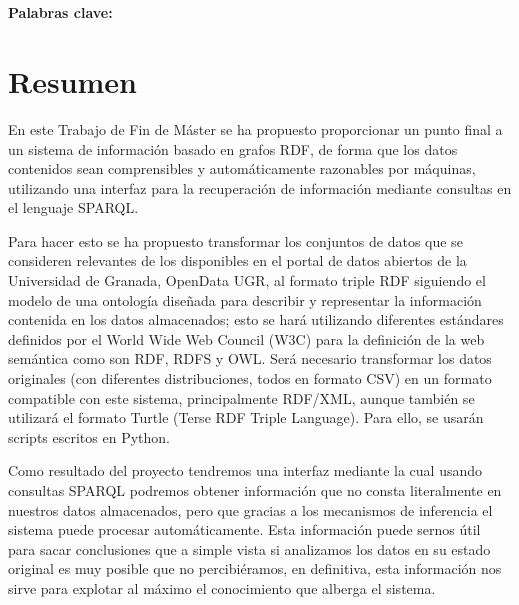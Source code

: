 \begin{center}
{\LARGE\bfseries\titulo}\\
\end{center}
\begin{center}
\autor\
\end{center}

\textbf{Palabras clave: }{\keywordsEs}

\section*{Resumen}

En este {\sf Trabajo de Fin de Máster} se ha propuesto proporcionar un punto final a un sistema de información basado en {\sf grafos RDF}, de forma que los datos contenidos sean comprensibles y automáticamente razonables por máquinas, utilizando una interfaz para la recuperación de información mediante consultas en el lenguaje {\sf SPARQL}. 

\bigskip
Para hacer esto se ha propuesto transformar los conjuntos de datos que se consideren relevantes de los disponibles en el portal de datos abiertos de la {\sf Universidad de Granada}, {\sf OpenData UGR}, al formato triple RDF siguiendo el modelo de una ontología diseñada para describir y representar la información contenida en los datos almacenados; esto se hará utilizando diferentes estándares definidos por el {\sf World Wide Web Council (W3C)} para la definición de la web semántica como son {\sf RDF}, {\sf RDFS} y {\sf OWL}. Será necesario transformar los datos originales (con diferentes distribuciones, todos en formato {\sf CSV}) en un formato compatible con este sistema, principalmente {\sf RDF/XML}, aunque también se utilizará el formato {\sf Turtle (Terse RDF Triple Language)}. Para ello, se usarán scripts escritos en {\sf Python}.

\bigskip
Como resultado del proyecto tendremos una interfaz mediante la cual usando consultas {\sf SPARQL} podremos obtener información que no consta literalmente en nuestros datos almacenados, pero que gracias a los mecanismos de inferencia el sistema puede procesar automáticamente. Esta información puede sernos útil para sacar conclusiones que a simple vista si analizamos los datos en su estado original es muy posible que no percibiéramos, en definitiva, esta información nos sirve para explotar al máximo el conocimiento que alberga el sistema.

\newpage
\begin{center}
{\LARGE\bfseries\tituloEng}\\
\end{center}
\begin{center}
\autor\
\end{center}

